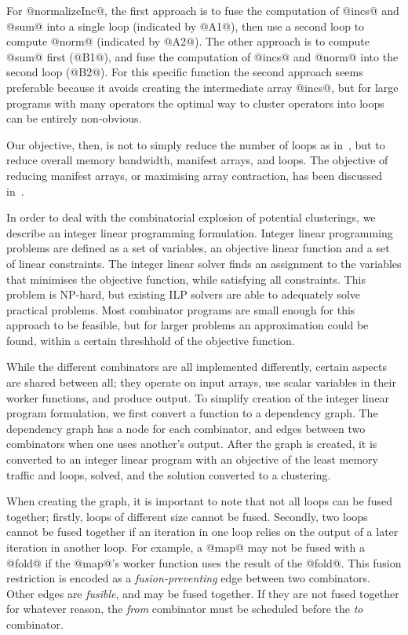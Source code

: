 For @normalizeInc@, the first approach is to fuse the computation of @incs@ and @sum@ into a single loop (indicated by @A1@), then use a second loop to compute @norm@ (indicated by @A2@). The other approach is to compute @sum@ first (@B1@), and fuse the computation of @incs@ and @norm@ into the second loop (@B2@). For this specific function the second approach seems preferable because it avoids creating the intermediate array @incs@, but for large programs with many operators the optimal way to cluster operators into loops can be entirely non-obvious. 

Our objective, then, is not to simply reduce the number of loops as in~\cite{kennedy1993typedfusion}, but to reduce overall memory bandwidth, manifest arrays, and loops.
The objective of reducing manifest arrays, or maximising array contraction, has been discussed in~\cite{gao1993collective, darte2002contraction}.

In order to deal with the combinatorial explosion of potential clusterings, we describe an integer linear programming formulation.
Integer linear programming problems are defined as a set of variables, an objective linear function and a set of linear constraints.
The integer linear solver finds an assignment to the variables that minimises the objective function, while satisfying all constraints.
This problem is NP-hard, but existing ILP solvers are able to adequately solve practical problems.
Most combinator programs are small enough for this approach to be feasible, but for larger problems an approximation could be found, within a certain threshhold of the objective function.



While the different combinators are all implemented differently, certain aspects are shared between all; they operate on input arrays, use scalar variables in their worker functions, and produce output.
To simplify creation of the integer linear program formulation, we first convert a function to a dependency graph.
The dependency graph has a node for each combinator, and edges between two combinators when one uses another's output.
After the graph is created, it is converted to an integer linear program with an objective of the least memory traffic and loops, solved, and the solution converted to a clustering.

When creating the graph, it is important to note that not all loops can be fused together; firstly, loops of different size cannot be fused. Secondly, two loops cannot be fused together if an iteration in one loop relies on the output of a later iteration in another loop. For example, a @map@ may not be fused with a @fold@ if the @map@'s worker function uses the result of the @fold@.
This fusion restriction is encoded as a \emph{fusion-preventing} edge between two combinators. Other edges are \emph{fusible}, and may be fused together. If they are not fused together for whatever reason, the \emph{from} combinator must be scheduled before the \emph{to} combinator.

